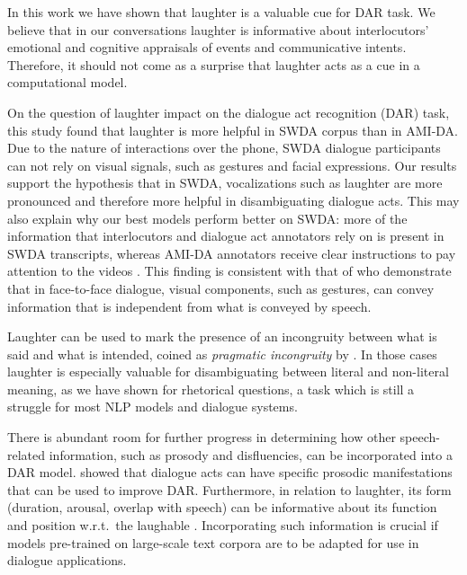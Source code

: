 \documentclass[11pt,a4paper]{article}
\begin{document}
In this work we have shown that laughter is a valuable cue for DAR
task. We believe that in our conversations laughter is informative
about interlocutors' emotional and cognitive appraisals of events and
communicative intents. %
Therefore, it should not come as a surprise
that laughter
acts as a cue in a computational model.

On the question of laughter impact on the dialogue act recognition
(DAR) task, this study found that laughter is more helpful in SWDA
corpus than in AMI-DA.  Due to the nature of interactions over the
phone, SWDA dialogue participants can not rely on visual signals, such
as gestures and facial expressions.  Our results support the
hypothesis that in SWDA, vocalizations such as laughter are more
pronounced and therefore more helpful in disambiguating dialogue acts.
This may also explain why our best models perform better on SWDA:
more of the information that interlocutors and dialogue act annotators
rely on is present in SWDA transcripts, whereas AMI-DA annotators receive
clear instructions to pay attention to the videos
\citep{GuidelinesDialogueAct2005}.  This finding is consistent with
that of \citet{bavelas2008gesturing} who demonstrate that in
face-to-face dialogue, visual components, such as gestures, can convey
information that is independent from what is conveyed by speech.

Laughter can be used to mark the presence of an incongruity between
what is said and what is intended, coined as \emph{pragmatic
  incongruity} by \citet{mazzocconiTAC}. In those cases laughter is
especially valuable for disambiguating between literal and non-literal
meaning, as we have shown for rhetorical questions, a task which is
still a struggle for most NLP models and dialogue systems.

There is abundant room for further progress in determining how other speech-related information, such as prosody and disfluencies, can be incorporated into a DAR model.
\citet{stolckeDialogueActModeling2000} showed that dialogue acts can have specific prosodic manifestations that can be used to improve DAR.
Furthermore, in relation to laughter, its form (duration, arousal, overlap with speech) can be informative about its function and position w.r.t.\ the laughable \citep{tian2016we,mazzocconi2019phd}.
Incorporating such information is crucial if models pre-trained on large-scale text corpora are to be adapted for use in dialogue applications.
\end{document}
